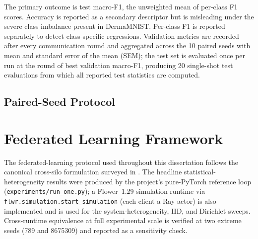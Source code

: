\documentclass[11pt,a4paper]{report}  %
\begin{document}
The primary outcome is test macro-F1, the unweighted mean of per-class
F1 scores. Accuracy is reported as a secondary descriptor but is
misleading under the severe class imbalance present in DermaMNIST.
Per-class F1 is reported separately to detect class-specific
regressions. Validation metrics are recorded after every communication
round and aggregated across the 10 paired seeds with mean and standard
error of the mean (SEM); the test set is evaluated once per run at the
round of best validation macro-F1, producing 20 single-shot test
evaluations from which all reported test statistics are computed.


\subsection*{Paired-Seed Protocol}


\section{Federated Learning Framework}
\label{sec:fl-framework}


The federated-learning protocol used throughout this dissertation
follows the canonical cross-silo formulation surveyed in
\citet{kairouz2021advances}. The headline statistical-heterogeneity
results were produced by the project's pure-PyTorch reference loop
(\texttt{experiments/run\_one.py}); a Flower~1.29 simulation runtime
\citep{beutel2020flower} via \texttt{flwr.simulation.start\_simulation}
(each client a Ray actor) is also implemented and is used for the
system-heterogeneity, IID, and Dirichlet sweeps. Cross-runtime
equivalence at full experimental scale is verified at two extreme
seeds (789 and 8675309) and reported as a sensitivity check.
\end{document}
